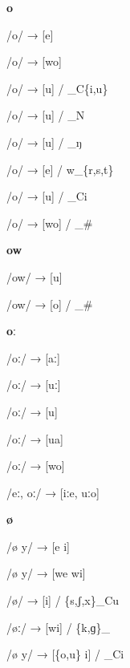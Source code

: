 \begin{center}\textbf{o}\end{center}
\begin{multicols}{4}
\noindent /o/ → [e]

\noindent /o/ → [wo]

\noindent /o/ → [u] / \_C\{i,u\}

\noindent /o/ → [u] / \_N

\noindent /o/ → [u] / \_ŋ

\noindent /o/ → [e] / w\_\{r,s,t\}

\noindent /o/ → [u] / \_Ci

\noindent /o/ → [wo] / \_\#

\end{multicols}

\begin{center}\textbf{ow}\end{center}
\begin{multicols}{4}
\noindent /ow/ → [u]

\noindent /ow/ → [o] / \_\#
\end{multicols}

\begin{center}\textbf{oː}\end{center}
\begin{multicols}{4}
\noindent /oː/ → [aː]

\noindent /oː/ → [uː]

\noindent /oː/ → [u]

\noindent /oː/ → [ua]

\noindent /oː/ → [wo]

\noindent /eː, oː/ → [iːe, uːo]
\end{multicols}

\begin{center}\textbf{ø}\end{center}
\begin{multicols}{4}
\noindent /ø y/ → [e i]

\noindent /ø y/ → [we wi]

\noindent /ø/ → [i] / \{s,ʃ,x\}\_Cu

\noindent /øː/ → [wi] / \{k,ɡ\}\_

\noindent /ø y/ → [\{o,u\} i] / \_Ci
\end{multicols}

